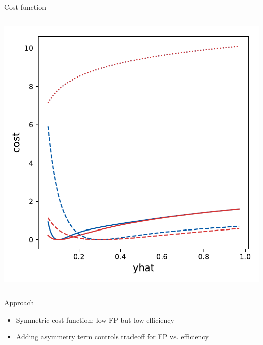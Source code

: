 \begin{frame}{Cost function}
\begin{columns}
      \centering
      \includegraphics[width=\textwidth, trim=20 0 20 0]{images/Asym_CostPlot_190302_linearA.pdf}
      \end{columns}


    \begin{block}{Approach}
      \begin{itemize}
         \item Symmetric cost function: low FP but low efficiency
         \item Adding asymmetry term controls tradeoff for FP vs. efficiency
     \end{itemize}
    \end{block}
\end{frame}
